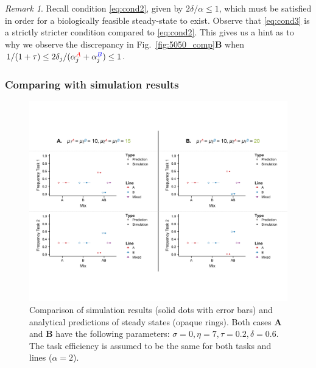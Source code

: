 \documentclass[10pt]{article}
\theoremstyle{remark}
\newtheorem*{remark}{Remark}
\newcommand{\A}{{\color{red}A}}
\newcommand{\B}{{\color{blue}B}}
\begin{document}
\begin{remark}
Recall condition \eqref{eq:cond2}, given by $2\delta/\alpha \leq 1$, which must be satisfied in order for a biologically feasible steady-state to exist. 
Observe that \eqref{eq:cond3} is a strictly stricter condition compared to \eqref{eq:cond2}. This gives us a hint as to why we observe the discrepancy in Fig.~\ref{fig:5050_comp}\textbf{B} when $1/(1+\tau) \leq 2\delta_j/(\alpha_j^{\A}+\alpha_j^{\B}) \leq 1$.
\end{remark}

\subsubsection{Comparing with simulation results}
\begin{figure}[H]
    \centering
    \includegraphics[trim={0 1.25in 0 1.25in}, clip, width=0.9\linewidth]{5050_comparison_mu.pdf}
    \caption{Comparison of simulation results (solid dots with error bars) and analytical predictions of steady states (opaque rings). Both cases \textbf{A} and \textbf{B} have the following parameters: $\sigma = 0, \eta = 7, \tau = 0.2, \delta = 0.6$. The task efficiency is assumed to be the same for both tasks and lines ($\alpha = 2$). 
    }
    \label{fig:5050_comp_mu}
\end{figure}
\end{document}

